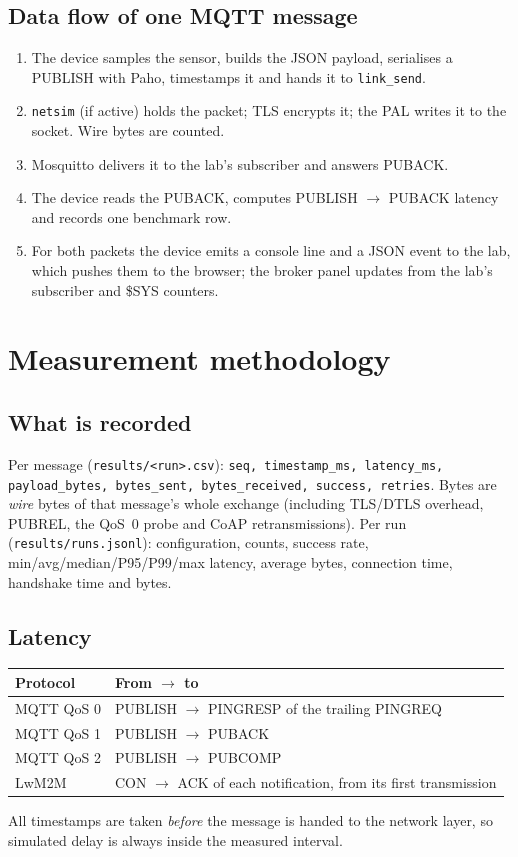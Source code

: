 \documentclass[11pt,a4paper]{article}
\newcommand{\code}[1]{\texttt{#1}}
\begin{document}
\subsection{Data flow of one MQTT message}
\begin{enumerate}
  \item The device samples the sensor, builds the JSON payload, serialises a
        PUBLISH with Paho, timestamps it and hands it to \code{link\_send}.
  \item \code{netsim} (if active) holds the packet; TLS encrypts it; the PAL
        writes it to the socket. Wire bytes are counted.
  \item Mosquitto delivers it to the lab's subscriber and answers PUBACK.
  \item The device reads the PUBACK, computes PUBLISH $\rightarrow$ PUBACK
        latency and records one benchmark row.
  \item For both packets the device emits a console line and a JSON event to
        the lab, which pushes them to the browser; the broker panel updates
        from the lab's subscriber and \$SYS counters.
\end{enumerate}

\section{Measurement methodology}

\subsection{What is recorded}
Per message (\code{results/<run>.csv}):
\code{seq, timestamp\_ms, latency\_ms, payload\_bytes, bytes\_sent,
bytes\_received, success, retries}. Bytes are \emph{wire} bytes of that
message's whole exchange (including TLS/DTLS overhead, PUBREL, the QoS~0 probe
and CoAP retransmissions). Per run (\code{results/runs.jsonl}): configuration,
counts, success rate, min/avg/median/P95/P99/max latency, average bytes,
connection time, handshake time and bytes.

\subsection{Latency}
\begin{center}
\begin{tabular}{@{}ll@{}}
\toprule
Protocol & From $\rightarrow$ to \\
\midrule
MQTT QoS 0 & PUBLISH $\rightarrow$ PINGRESP of the trailing PINGREQ \\
MQTT QoS 1 & PUBLISH $\rightarrow$ PUBACK \\
MQTT QoS 2 & PUBLISH $\rightarrow$ PUBCOMP \\
LwM2M & CON $\rightarrow$ ACK of each notification, from its first transmission \\
\bottomrule
\end{tabular}
\end{center}
All timestamps are taken \emph{before} the message is handed to the network
layer, so simulated delay is always inside the measured interval.
\end{document}
